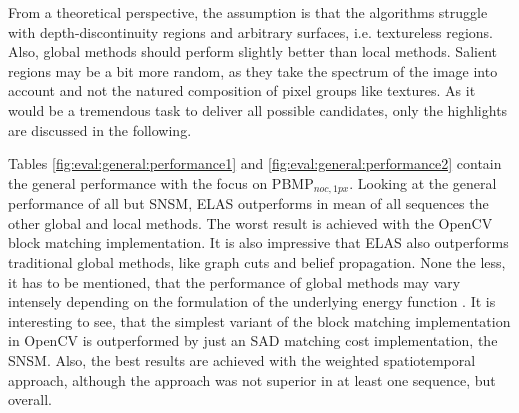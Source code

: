 From a theoretical perspective, the assumption is that the algorithms struggle with depth-discontinuity regions and arbitrary surfaces, i.e. textureless regions.
Also, global methods should perform slightly better than local methods.
Salient regions may be a bit more random, as they take the spectrum of the image into account and not the natured composition of pixel groups like textures.
As it would be a tremendous task to deliver all possible candidates, only the highlights are discussed in the following.

\begin{table}[h!]
\centering
{}
\caption[Result table for general performance]{Result table for general performance of available algorithms, focusing on PBMP$_{noc,1px}$}
\label{fig:eval:general:performance1}
\end{table}

\noindent Tables \ref{fig:eval:general:performance1} and \ref{fig:eval:general:performance2} contain the general performance with the focus on PBMP$_{noc,1px}$.
Looking at the general performance of all but SNSM, ELAS outperforms in mean of all sequences the other global and local methods.
The worst result is achieved with the OpenCV block matching implementation.
It is also impressive that ELAS also outperforms traditional global methods, like graph cuts and belief propagation.
None the less, it has to be mentioned, that the performance of global methods may vary intensely depending on the formulation of the underlying energy function \citep{cyganek2011introduction, szeliski2008comparative, scharstein2006middlebury}.
It is interesting to see, that the simplest variant of the block matching implementation in OpenCV is outperformed by just an SAD matching cost implementation, the SNSM.
Also, the best results are achieved with the weighted spatiotemporal approach, although the approach was not superior in at least one sequence, but overall.


